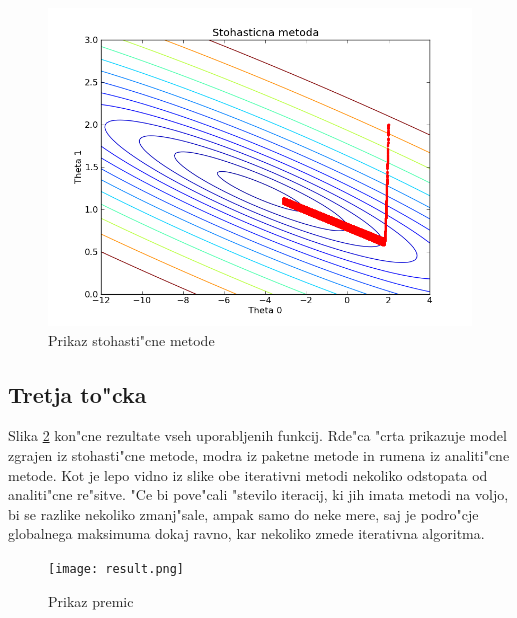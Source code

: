 \documentclass[a4paper,11pt]{article}
\begin{document}
\begin{figure}[H]
\label{sto}
\begin{center}
\includegraphics[scale=0.3]{sto.png}
\caption{Prikaz stohasti"cne metode}
\end{center}

\end{figure}

\subsection{Tretja to"cka}
Slika \ref{result} kon"cne rezultate vseh uporabljenih funkcij. Rde"ca "crta prikazuje model zgrajen iz stohasti"cne metode, modra iz paketne metode in rumena iz analiti"cne metode. Kot je lepo vidno iz slike obe iterativni metodi nekoliko odstopata od analiti"cne re"sitve. "Ce bi pove"cali "stevilo iteracij, ki jih imata metodi na voljo, bi se razlike nekoliko zmanj"sale, ampak samo do neke mere, saj je podro"cje globalnega maksimuma dokaj ravno, kar nekoliko zmede iterativna algoritma.
\begin{figure}[H]
\begin{center}
\texttt{[image: result.png]}
\caption{Prikaz premic}
\end{center}
\label{result}
\end{figure}
\end{document}

